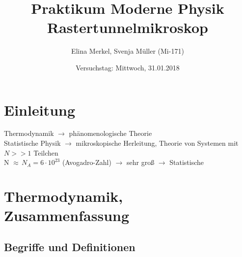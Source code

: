 \documentclass[a4paper,11pt]{scrartcl}
\begin{document}
\begin{titlepage}


\title{Praktikum Moderne Physik\\Rastertunnelmikroskop}
\author{Elina Merkel, Svenja Müller (Mi-171)}
\date{Versuchstag: Mittwoch, 31.01.2018}

\vfill
\maketitle
\end{titlepage}
\newpage
\tableofcontents
\newpage
\section{Einleitung}
Thermodynamik $\rightarrow$ phänomenologische Theorie\\
Statistische Physik $\rightarrow$ mikroskopische Herleitung, Theorie von Systemen mit $N>>1$ Teilchen \\
N $\approx \,N_A = 6 \cdot 10^{23}$ (Avogadro-Zahl) $\rightarrow$ sehr groß $\rightarrow$ Statistische
\section{Thermodynamik, Zusammenfassung}
\subsection{Begriffe und Definitionen}
\end{document}
